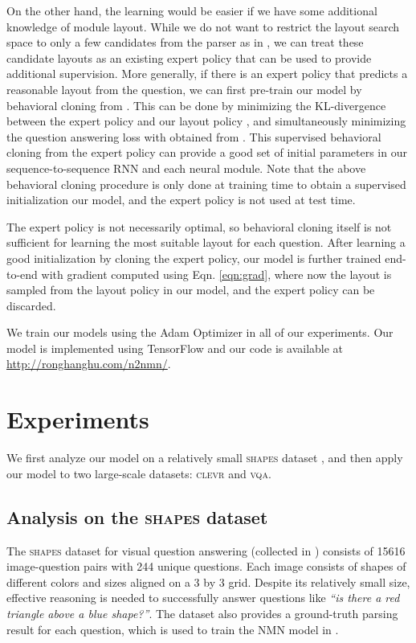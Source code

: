 \documentclass[10pt,twocolumn,letterpaper]{article}
\newcommand{\shapes}{\textsc{shapes}\xspace}
\newcommand{\clevr}{\textsc{clevr}\xspace}
\newcommand{\vqa}{\textsc{vqa}\xspace}
\begin{document}
On the other hand, the learning would be easier if we have some additional knowledge of module layout. While we do not want to restrict the layout search space to only a few candidates from the parser as in \cite{andreas2016learning}, we can treat these candidate layouts as an existing expert policy that can be used to provide additional supervision. More generally, if there is an expert policy  that predicts a reasonable layout  from the question, we can first pre-train our model by behavioral cloning from . This can be done by minimizing the KL-divergence  between the expert policy  and our layout policy , and simultaneously minimizing the question answering loss  with  obtained from . This supervised behavioral cloning from the expert policy can provide a good set of initial parameters in our sequence-to-sequence RNN and each neural module. Note that the above behavioral cloning procedure is only done at training time to obtain a supervised initialization our model, and the expert policy is not used at test time.

The expert policy is not necessarily optimal, so behavioral cloning itself is not sufficient for learning the most suitable layout for each question. After learning a good initialization by cloning the expert policy, our model is further trained end-to-end with gradient  computed using Eqn. \ref{eqn:grad}, where now the layout  is sampled from the layout policy  in our model, and the expert policy  can be discarded.

We train our models using the Adam Optimizer \cite{kingma2015adam} in all of our experiments. Our model is implemented using TensorFlow \cite{tensorflow2015-whitepaper} and our code is available at \url{http://ronghanghu.com/n2nmn/}.

\section{Experiments}

We first analyze our model on a relatively small \shapes dataset \cite{andreas16neural}, and then apply our model to two large-scale datasets: \clevr \cite{johnson2017clevr} and \vqa \cite{antol15iccv}.

\subsection{Analysis on the \shapes dataset}
\label{sec:exp_shapes}

The \shapes dataset for visual question answering (collected in \cite{andreas16neural}) consists of 15616 image-question pairs with 244 unique questions. Each image consists of shapes of different colors and sizes aligned on a 3 by 3 grid. Despite its relatively small size, effective reasoning is needed to successfully answer questions like \textit{``is there a red triangle above a blue shape?''}. The dataset also provides a ground-truth parsing result for each question, which is used to train the NMN model in \cite{andreas16neural}.
\end{document}
